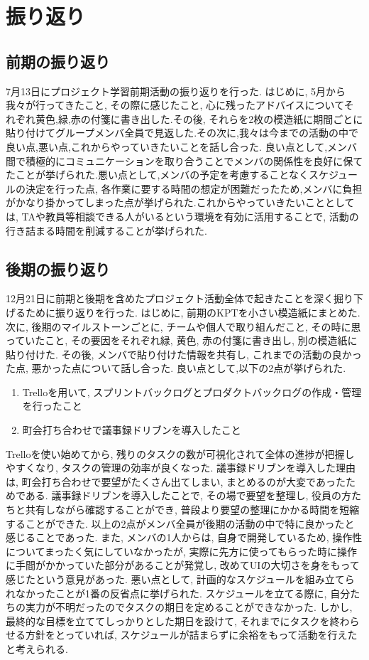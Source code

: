 \chapter{振り返り}

\section{前期の振り返り}
7月13日にプロジェクト学習前期活動の振り返りを行った. はじめに, 5月から我々が行ってきたこと, その際に感じたこと, 心に残ったアドバイスについてそれぞれ黄色,緑,赤の付箋に書き出した.その後,
それらを2枚の模造紙に期間ごとに貼り付けてグループメンバ全員で見返した.その次に,我々は今までの活動の中で良い点,悪い点,これからやっていきたいことを話し合った.
良い点として,メンバ間で積極的にコミュニケーションを取り合うことでメンバの関係性を良好に保てたことが挙げられた.悪い点として,メンバの予定を考慮することなくスケジュールの決定を行った点,
各作業に要する時間の想定が困難だったため,メンバに負担がかなり掛かってしまった点が挙げられた.これからやっていきたいこととしては, TAや教員等相談できる人がいるという環境を有効に活用することで,
活動の行き詰まる時間を削減することが挙げられた.

\section{後期の振り返り}
12月21日に前期と後期を含めたプロジェクト活動全体で起きたことを深く掘り下げるために振り返りを行った. はじめに, 前期のKPTを小さい模造紙にまとめた.
次に, 後期のマイルストーンごとに, チームや個人で取り組んだこと, その時に思っていたこと, その要因をそれぞれ緑, 黄色, 赤の付箋に書き出し, 別の模造紙に貼り付けた.
その後, メンバで貼り付けた情報を共有し, これまでの活動の良かった点, 悪かった点について話し合った. 良い点として,以下の2点が挙げられた. 
\begin{enumerate}
    \item Trelloを用いて, スプリントバックログとプロダクトバックログの作成・管理を行ったこと
    \item 町会打ち合わせで議事録ドリブンを導入したこと
\end{enumerate}
Trelloを使い始めてから, 残りのタスクの数が可視化されて全体の進捗が把握しやすくなり, タスクの管理の効率が良くなった. 議事録ドリブンを導入した理由は, 町会打ち合わせで要望がたくさん出てしまい,
まとめるのが大変であったためである. 議事録ドリブンを導入したことで, その場で要望を整理し, 役員の方たちと共有しながら確認することができ, 普段より要望の整理にかかる時間を短縮することができた.
以上の2点がメンバ全員が後期の活動の中で特に良かったと感じることであった. また, メンバの1人からは, 自身で開発しているため, 操作性についてまったく気にしていなかったが,
実際に先方に使ってもらった時に操作に手間がかかっていた部分があることが発覚し, 改めてUIの大切さを身をもって感じたという意見があった.
悪い点として, 計画的なスケジュールを組み立てられなかったことが1番の反省点に挙げられた. スケジュールを立てる際に, 自分たちの実力が不明だったのでタスクの期日を定めることができなかった.
しかし, 最終的な目標を立ててしっかりとした期日を設けて, それまでにタスクを終わらせる方針をとっていれば, スケジュールが詰まらずに余裕をもって活動を行えたと考えられる.

